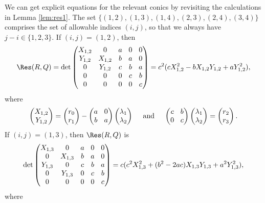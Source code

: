 We can get explicit equations for the relevant conics by revisiting the calculations in
Lemma \ref{lem:res1}.
The set
$\{(1,2),(1,3),(1,4),(2,3),(2,4),(3,4)\}$ comprises the set of allowable indices $(i,j)$,
so that we always have $j-i\in\{1,2,3\}$.
If $(i,j)=(1,2)$, then
\[\arraycolsep4.5pt
\Res(R,Q)=
\det\begin{pmatrix}
X_{1,2} & 0 & a& 0& 0 \\
Y_{1,2} & X_{1,2}& b& a& 0 \\
0 & Y_{1,2}& c& b& a \\
0 & 0& 0& c& b \\
0 & 0& 0& 0& c
\end{pmatrix}=c^2 (c X_{1,2}^2- b X_{1,2} Y_{1,2} +a Y_{1,2}^2 ),
\]
where
\[\arraycolsep4.5pt
\begin{pmatrix}
X_{1,2}\\
Y_{1,2}\end{pmatrix}
=\begin{pmatrix}
r_0\\
r_1\end{pmatrix}
-\begin{pmatrix}
a & 0 \\
b & a
\end{pmatrix}\begin{pmatrix}
\lambda_1 \\
\lambda_2
\end{pmatrix}\quad\text{ and }\quad\begin{pmatrix}
c & b \\
0 & c
\end{pmatrix}\begin{pmatrix}
\lambda_1 \\
\lambda_2 \\
\end{pmatrix}=\begin{pmatrix}
r_2 \\
r_3
\end{pmatrix}.
\]
If $(i,j)=(1,3)$, then $\Res(R,Q)$ is
\[\arraycolsep4.5pt
\det\begin{pmatrix}
X_{1,3} & 0 & a& 0& 0 \\
0 & X_{1,3}& b& a& 0 \\
Y_{1,3} & 0& c& b& a \\
0 & Y_{1,3}& 0& c& b \\
0 & 0& 0& 0& c \\
\end{pmatrix}=c (c^2 X_{1,3}^2+(b^2- 2 a c) X_{1,3} Y_{1,3} +a^2 Y_{1,3}^2),
\]
where
